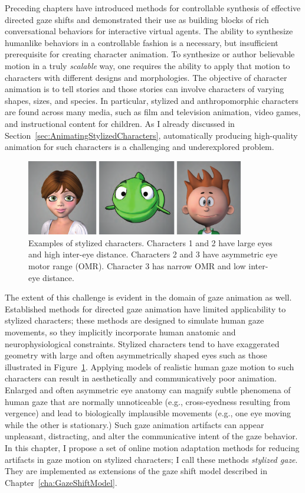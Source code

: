 Preceding chapters have introduced methods for controllable synthesis of effective directed gaze shifts and demonstrated their use as building blocks of rich conversational behaviors for interactive virtual agents. The ability to synthesize humanlike behaviors in a controllable fashion is a necessary, but insufficient prerequisite for creating character animation.
To synthesize or author believable motion in a truly \emph{scalable} way, one requires the ability to apply that motion to characters with different designs and morphologies. The objective of character animation is to tell stories and those stories can involve characters of varying shapes, sizes, and species. In particular, stylized and anthropomorphic characters are found across many media, such as film and television animation, video games, and instructional content for children. As I already discussed in Section~\ref{sec:AnimatingStylizedCharacters}, automatically producing high-quality animation for such characters is a challenging and underexplored problem.

\begin{figure}
\centering
\includegraphics[width=0.85\textwidth]{stylizedgaze/Figures/StylizedCharacterExamples-small.pdf}
\caption{Examples of stylized characters. Characters 1 and 2 have large eyes and high inter-eye distance. Characters 2 and 3 have asymmetric eye motor range (OMR). Character 3 has narrow OMR and low inter-eye distance.}
\label{fig:StylizedCharacterExamples}
\end{figure}

The extent of this challenge is evident in the domain of gaze animation as well. Established methods for directed gaze animation have limited applicability to stylized characters; these methods are designed to simulate human gaze movements, so they implicitly incorporate human anatomic and neurophysiological constraints. Stylized characters tend to have exaggerated geometry with large and often asymmetrically shaped eyes such as those illustrated in Figure~\ref{fig:StylizedCharacterExamples}. Applying models of realistic human gaze motion to such characters can result in aesthetically and communicatively poor animation. Enlarged and often asymmetric eye anatomy can magnify subtle phenomena of human gaze that are normally unnoticeable (e.g., cross-eyedness resulting from vergence) and lead to biologically implausible movements (e.g., one eye moving while the other is stationary.) Such gaze animation artifacts can appear unpleasant, distracting, and alter the communicative intent of the gaze behavior. In this chapter, I propose a set of online motion adaptation methods for reducing artifacts in gaze motion on stylized characters; I call these methods \emph{stylized gaze}. They are implemented as extensions of the gaze shift model described in Chapter~\ref{cha:GazeShiftModel}.

